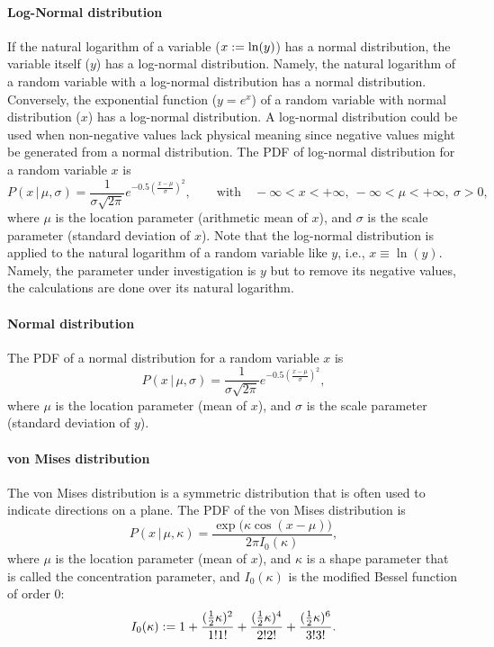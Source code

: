 	\paragraph{Log-Normal distribution}	If the natural logarithm of a variable ($x\mathrel{:=}\ln(y)$) has a normal distribution, the variable itself ($y$) has a log-normal distribution. Namely, the natural logarithm of a random variable with a log-normal distribution has a normal distribution. Conversely, the exponential function ($y=e^x$) of a random variable with normal distribution ($x$) has a log-normal distribution. A log-normal distribution could be used when non-negative values lack physical meaning since negative values might be generated from a normal distribution. The PDF of log-normal distribution for a random variable $x$ is
    \begin{equation}
    	P(x\,|\,\mu,\sigma)=\frac{1}{\sigma\sqrt{2\pi}}e^{-0.5\left(\frac{x-\mu}{\sigma}\right)^2},\qquad\text{with}\quad -\infty<x<+\infty,\ -\infty<\mu<+\infty,\ \sigma>0,
    \end{equation}
    where $\mu$ is the location parameter (arithmetic mean of $x$), and $\sigma$ is the scale parameter (standard deviation of $x$). Note that the log-normal distribution is applied to the natural logarithm of a random variable like $y$, i.e., $x\equiv\ln(y)$. Namely, the parameter under investigation is $y$ but to remove its negative values, the calculations are done over its natural logarithm.
    
	\paragraph{Normal distribution} The PDF of a normal distribution for a random variable $x$ is
    \begin{equation}
    	P(x\,|\,\mu,\sigma)=\frac{1}{\sigma\sqrt{2\pi}}e^{-0.5(\frac{x-\mu}{\sigma})^2},
    \end{equation}
    where $\mu$ is the location parameter (mean of $x$), and $\sigma$ is the scale parameter (standard deviation of $y$).

\red
	\paragraph{von Mises distribution} The von Mises distribution is a symmetric distribution that is often used to indicate directions on a plane. The PDF of the von Mises distribution is~\autocite{Fisher.1987}
	\begin{equation}
		P(x\,|\,\mu,\kappa) =\frac{ \exp\big({\kappa\cos(x-\mu)}\big)}{2\pi I_0(\kappa)},
	\end{equation}
	where $\mu$ is the location parameter (mean of $x$), and $\kappa$ is a shape parameter that is called the concentration parameter, and $I_0(\kappa)$ is the modified Bessel function of order 0:
	\begin{equation}
		I_0(\kappa)\mathrel{:=} 1+\frac{(\tfrac{1}{2}\kappa)^2}{1!1!} + \frac{(\tfrac{1}{2}\kappa)^4}{2!2!}+\frac{(\tfrac{1}{2}\kappa)^6}{3!3!}.
	\end{equation}
	
